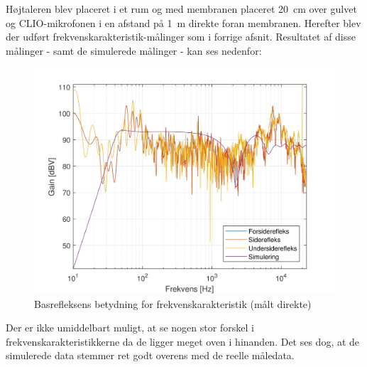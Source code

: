 \newpage
Højtaleren blev placeret i et rum og med membranen placeret \SI{20}{\centi\meter} over gulvet og CLIO-mikrofonen i en afstand på \SI{1}{\meter} direkte foran membranen. Herefter blev der udført frekvenskarakteristik-målinger som i forrige afsnit. Resultatet af disse målinger - samt de simulerede målinger - kan ses nedenfor:
\begin{figure}[H]
	\centering
	\vspace{-12pt}
	\includegraphics[width=\textwidth]{Billeder/Grafer/RealDirect}
	\caption{Basrefleksens betydning for frekvenskarakteristik (målt direkte)}
\end{figure}

Der er ikke umiddelbart muligt, at se nogen stor forskel i frekvenskarakteristikkerne da de ligger meget oven i hinanden. Det ses dog, at de simulerede data stemmer ret godt overens med de reelle måledata.

